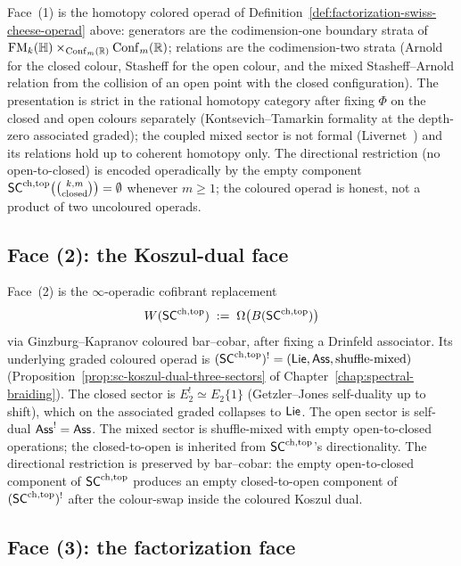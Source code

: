 Face~(1) is the homotopy colored operad of
Definition~\ref{def:factorization-swiss-cheese-operad} above:
generators are the codimension-one boundary strata of
$\mathrm{FM}_k(\mathbb{H})\times_{\mathrm{Conf}_m(\mathbb{R})}\mathrm{Conf}_m(\mathbb{R})$;
relations are the codimension-two strata (Arnold for the closed
colour, Stasheff for the open colour, and the mixed Stasheff--Arnold
relation from the collision of an open point with the closed
configuration). The presentation is strict in the rational homotopy
category after fixing $\Phi$ on the closed and open colours
separately (Kontsevich--Tamarkin formality at the depth-zero
associated graded); the coupled mixed sector is not formal
(Livernet~\cite{Liv15}) and its relations hold up to coherent
homotopy only.
The directional restriction (no open-to-closed) is encoded
operadically by the empty component
$\mathsf{SC}^{\mathrm{ch},\mathrm{top}}\bigl(\binom{k,m}{\text{closed}}\bigr)=\emptyset$ whenever
$m\geq 1$; the coloured operad is honest, not a product of two
uncoloured operads.

\subsection{Face (2): the Koszul-dual face}\label{subsec:face-koszul-dual}

Face~(2) is the $\infty$-operadic cofibrant replacement
\begin{equation}
 W(\mathsf{SC}^{\mathrm{ch},\mathrm{top}})
 \;:=\;
 \Omega\bigl(B(\mathsf{SC}^{\mathrm{ch},\mathrm{top}})\bigr)
\end{equation}
via Ginzburg--Kapranov coloured bar--cobar, after fixing a Drinfeld
associator. Its underlying graded coloured operad is
$(\mathsf{SC}^{\mathrm{ch},\mathrm{top}})^{!}=(\mathsf{Lie},\mathsf{Ass},\text{shuffle-mixed})$
(Proposition~\ref{prop:sc-koszul-dual-three-sectors} of
Chapter~\ref{chap:spectral-braiding}).
The closed sector is
$E_2^{!}\simeq E_2\{1\}$ (Getzler--Jones self-duality up to shift),
which on the associated graded collapses to $\mathsf{Lie}$.
The open sector is self-dual $\mathsf{Ass}^{!}=\mathsf{Ass}$. The mixed sector is
shuffle-mixed with empty open-to-closed operations; the
closed-to-open is inherited from $\mathsf{SC}^{\mathrm{ch},\mathrm{top}}$'s directionality.
The directional restriction is preserved by bar--cobar: the empty
open-to-closed component of $\mathsf{SC}^{\mathrm{ch},\mathrm{top}}$ produces an empty
closed-to-open component of $(\mathsf{SC}^{\mathrm{ch},\mathrm{top}})^!$ after the colour-swap
inside the coloured Koszul dual.

\subsection{Face (3): the factorization face}\label{subsec:face-factorization}

